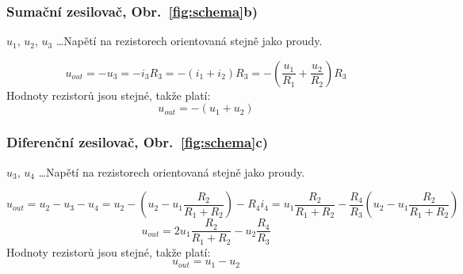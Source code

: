     \subsubsection{Sumační zesilovač, Obr.~\ref{fig:schema}b)}
        $ u_1 $, $ u_2 $, $ u_3 $ \dots Napětí na rezistorech orientovaná stejně jako proudy. 

        $$ u_{out} = -u_3 = -i_3R_3 = -(i_1+i_2)R_3 = -(\frac{u_1}{R_1}+\frac{u_2}{R_2})R_3 $$
        Hodnoty rezistorů jsou stejné, takže platí:
        $$ u_{out} = -(u_1+u_2) $$

    \subsubsection{Diferenční zesilovač, Obr.~\ref{fig:schema}c)}
        $ u_3 $, $ u_4 $ \dots Napětí na rezistorech orientovaná stejně jako proudy. 

        $$ u_{out} = u_2-u_3-u_4 =u_2 -(u_2-u_1\frac{R_2}{R_1+R_2})-R_4i_4 =  u_1\frac{R_2}{R_1+R_2}-\frac{R_4}{R_3}(u_2-u_1\frac{R_2}{R_1+R_2}) $$
        $$ u_{out}= 2u_1\frac{R_2}{R_1+R_2} -u_2\frac{R_4}{R_3}$$
        Hodnoty rezistorů jsou stejné, takže platí:
        $$ u_{out}=u_1-u_2$$

